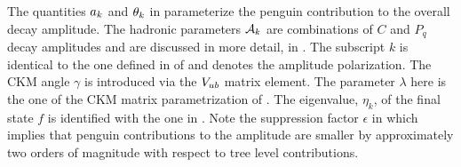 \noindent The quantities $a_k$ and $\theta_k$ in  parameterize the penguin
contribution to the overall \BsJpsiPhi decay amplitude. The hadronic parameters $\mathcal{A}_{k}$ are combinations
of $C$ and $P_q$ decay amplitudes and are discussed in more detail, in .
The subscript $k$ is identical to the one defined in  of 
and denotes the \BsJpsiPhi amplitude polarization. The CKM angle $\gamma$ is introduced via the $V_{ub}$ matrix element.
The parameter $\lambda$ here is the one of the CKM matrix parametrization of .
The eigenvalue, $\eta_k$, of the final state $f$ is identified with the one in .
Note the suppression factor $\epsilon$ in  which implies that penguin contributions
to the \BsJpsiPhi amplitude are smaller by approximately two orders of magnitude with respect to tree level contributions.
